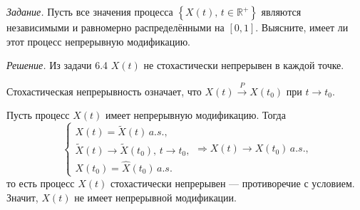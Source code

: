 \textit{Задание.}
Пусть все значения процесса $ \left\{ X \left( t \right), \, t \in \mathbb{R}^+ \right\} $
являются независимыми и равномерно распределёнными на $ \left[ 0, 1 \right] $.
Выясните, имеет ли этот процесс непрерывную модификацию.

\textit{Решение.}
Из задачи 6.4 $X \left( t \right) $ не стохастически непрерывен в каждой точке.

Стохастическая непрерывность означает,
что $X \left( t \right) \overset{P}{ \to } X \left( t_0 \right) $ при $t \to t_0$.

Пусть процесс $X \left( t \right) $ имеет непрерывную модификацию.
Тогда
$$ \begin{cases}
    X \left( t \right) = \tilde{X} \left( t \right) \, a.s., \\
    \tilde{X} \left( t \right) \to \tilde{X} \left( t_0 \right), \, t \to t_0, \\
    X \left( t_0 \right) = \hat{X} \left( t_0 \right) \, a.s.
  \end{cases} \Rightarrow X \left( t \right) \to X \left( t_0 \right) \, a.s.,$$
то есть процесс $X \left( t \right) $ стохастически непрерывен --- противоречие с условием.
Значит, $X \left( t \right) $ не имеет непрерывной модификации.

